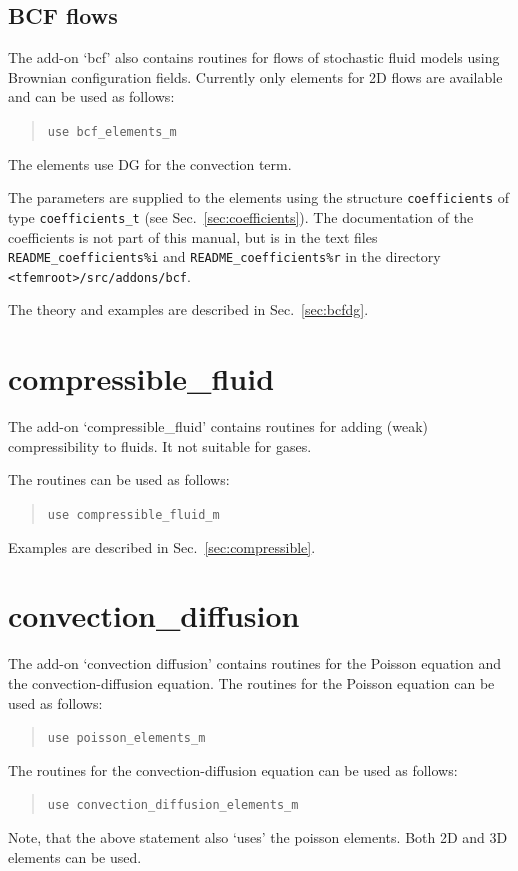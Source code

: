 \subsection{BCF flows}

The add-on `bcf' also contains routines for flows of
stochastic fluid models using Brownian configuration fields.
Currently only elements for 2D flows are available
 and can be used as follows:
\begin{quote}
   \texttt{use bcf\_elements\_m}
\end{quote}
The elements use DG for the convection term.

The parameters are
supplied to the elements using the structure \texttt{coefficients} of type
\texttt{coefficients\_t} (see Sec.~\ref{sec:coefficients}). The documentation
of the coefficients is not part of this manual, but is in the text files
\texttt{README\_coefficients\%i} and
\texttt{README\_coefficients\%r} in the directory
\texttt{<tfemroot>/src/addons/bcf}.

The theory and examples are described in Sec.~\ref{sec:bcfdg}.

\section{compressible\_fluid}
\label{sec:addon_compressible}

The add-on `compressible\_fluid' contains routines for adding (weak)
compressibility to fluids. It not suitable for gases.

The routines can be used as follows:
\begin{quote}
   \texttt{use compressible\_fluid\_m}
\end{quote}

Examples are described in Sec.~\ref{sec:compressible}.

\section{convection\_diffusion}
\label{sec:convdiff_elements}

The add-on `convection diffusion' contains routines for the Poisson equation
and the convection-diffusion equation. The routines for the Poisson equation
can be used as follows:
\begin{quote}
   \texttt{use poisson\_elements\_m}
\end{quote}
The routines for the convection-diffusion equation can be used as follows:
\begin{quote}
   \texttt{use convection\_diffusion\_elements\_m}
\end{quote}
Note, that the above statement also `uses' the poisson elements.
Both 2D and 3D elements can be used.

